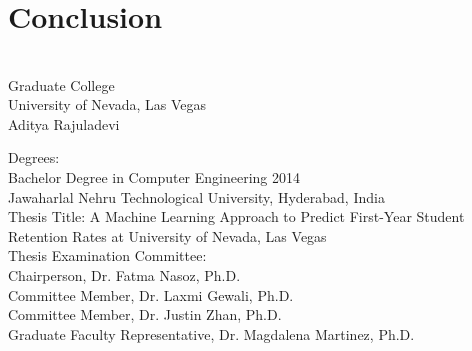 \documentclass[11pt,openright]{report}
\begin{document}
\chapter{Conclusion} \label{chapter:conclusion}



\vita
\chapter{} %
\linespread{1.3} 
\begin{center}
Graduate College\\
University of Nevada, Las Vegas\\[1cm]
Aditya Rajuladevi\\[1cm]
\end{center}

\noindent Degrees:\\
\indent Bachelor Degree in Computer Engineering 2014\\
\indent Jawaharlal Nehru Technological University, Hyderabad, India\\

\noindent Thesis Title: A Machine Learning Approach to Predict First-Year Student Retention Rates at University of Nevada, Las Vegas\\

\noindent Thesis Examination Committee:\\
\indent Chairperson, Dr. Fatma Nasoz, Ph.D.\\
\indent Committee Member, Dr. Laxmi Gewali, Ph.D.\\
\indent Committee Member, Dr. Justin Zhan, Ph.D.\\
\indent Graduate Faculty Representative, Dr. Magdalena Martinez, Ph.D.\\
\end{document}

